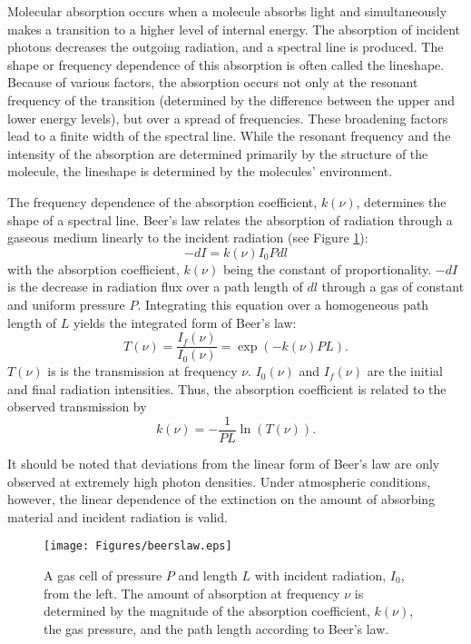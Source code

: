 \documentclass[11pt]{article}
\begin{document}
Molecular absorption occurs when a molecule absorbs light and 
simultaneously makes a transition to a higher level of internal 
energy.  The absorption of incident photons decreases the outgoing 
radiation, and a spectral line is produced.  The shape or frequency 
dependence of this absorption is often called the lineshape.  Because 
of various factors, the absorption occurs not only at the resonant 
frequency of the transition (determined by the difference between the 
upper and lower energy levels), but over a spread of frequencies.  
These broadening factors lead to a finite width of the spectral 
line.  While the resonant frequency and the intensity of the 
absorption are determined primarily by the structure of the molecule, the 
lineshape is determined by the molecules' environment.  

The frequency dependence of the absorption coefficient, $k(\nu)$, 
determines the shape of a spectral line.  Beer's law relates the 
absorption of radiation through a gaseous medium linearly to the incident 
radiation (see Figure \ref{fig:beers_law}):
\begin{equation}
   -dI = k(\nu)I_{0}P dl
\label{eqn:blaw1}
\end{equation}
with the absorption coefficient, $k(\nu)$ being the constant of
proportionality.  $-dI$ is the decrease in radiation flux over a path 
length of $dl$ through a gas of constant and uniform pressure $P$.  
Integrating this equation over a homogeneous path length of $L$ yields 
the integrated form of Beer's law:
\begin{equation}
 T(\nu)=\frac{I_f(\nu)}{I_0(\nu)}=\exp\left(-k(\nu)P L\right).
\label{eqn:blaw2}
\end{equation}
$T(\nu)$ is is the transmission at frequency $\nu$. $I_{0}(\nu)$ and
$I_f(\nu)$ are the initial and final radiation intensities.  Thus, the 
absorption coefficient is related to the observed transmission by 
\begin{equation}
 k(\nu)=-\frac{1}{P L}\ln\left(T(\nu)\right).
\end{equation}

It should be noted that deviations from the linear form of Beer's law are
only observed at extremely high photon densities.  Under atmospheric
conditions, however, the linear dependence of the extinction on the amount 
of absorbing material and incident radiation is valid. 

\begin{figure}[h]
 \begin{center}
  \texttt{[image: Figures/beerslaw.eps]}\end{center}
  \caption[An illustration of Beer's law.]{A gas cell of pressure $P$ and 
    length $L$ with incident radiation,
    $I_{0}$, from the left.  The amount of absorption at frequency $\nu$ is
    determined by the magnitude of the absorption coefficient, $k(\nu)$,
    the gas pressure, and the path length according to Beer's law.}
  \label{fig:beers_law}
\end{figure}
\end{document}
